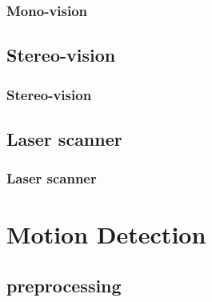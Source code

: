 \documentclass{beamer}
\begin{document}
	\begin{frame}
		\frametitle{Mono-vision}
	\end{frame}

\subsection{Stereo-vision}

	\begin{frame}
		\frametitle{Stereo-vision}
	\end{frame}

\subsection{Laser scanner}

	\begin{frame}
		\frametitle{Laser scanner}
	\end{frame}

\section{Motion Detection}

\subsection{preprocessing}
\end{document}
